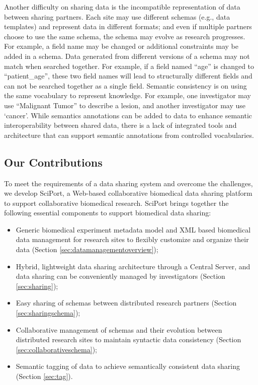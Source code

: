 \documentclass{singlecol-new}
\theoremstyle{TH}{
\newtheorem{lemma}{Lemma}
\newtheorem{theorem}[lemma]{Theorem}
\newtheorem{corrolary}[lemma]{Corrolary}
\newtheorem{conjecture}[lemma]{Conjecture}
\newtheorem{proposition}[lemma]{Proposition}
\newtheorem{claim}[lemma]{Claim}
\newtheorem{stheorem}[lemma]{Wrong Theorem}
\newtheorem{algorithm}{Algorithm}
}
\theoremstyle{THrm}{
\newtheorem{definition}{Definition}[section]
\newtheorem{question}{Question}[section]
\newtheorem{remark}{Remark}
\newtheorem{scheme}{Scheme}
}
\theoremstyle{THhit}{
\newtheorem{case}{Case}[section]
}
\begin{document}
Another difficulty on sharing data is the incompatible
representation of data between sharing partners. Each site may use
different schemas (e.g., data templates) and represent data in
different formats; and even if multiple partners choose to use the
same schema, the schema may evolve as research progresses. For
example, a field name may be changed or additional constraints may
be added in a schema. Data generated from different versions of a
schema  may not match when searched together. For example, if a
field named ``age'' is changed to ``patient\_age'',  these two field
names will lead to structurally different fields and can not be
searched together as a single field.   Semantic consistency is on
using the same vocabulary to represent knowledge. For example,  one
investigator may use ``Malignant Tumor'' to describe a lesion, and
another investigator  may use `cancer'.    While semantics
annotations can be added to data to enhance semantic
interoperability between shared data, there is a lack of integrated
tools and architecture that can support semantic annotations from
controlled vocabularies.

\subsection{Our Contributions}


To meet the requirements of a data sharing system and overcome the
challenges, we develop SciPort, a Web-based collaborative biomedical
data sharing platform to support collaborative biomedical research.
SciPort brings together the following essential components to
support biomedical data sharing:


\begin{itemize}

\item Generic biomedical experiment metadata model and XML based biomedical data management for research sites to flexibly customize and organize their data (Section
\ref{sec:datamanagementoverview});

\item Hybrid, lightweight data sharing architecture through a Central
Server, and data sharing can be conveniently managed by investigators (Section \ref{sec:sharing});

\item Easy sharing of schemas between distributed research partners (Section \ref{sec:sharingschema});

\item Collaborative management of schemas and their evolution between distributed research sites to maintain syntactic data consistency  (Section \ref{sec:collaborativeschema});

\item Semantic tagging of data to achieve semantically consistent data sharing (Section \ref{sec:tag}).
\end{itemize}
\end{document}
